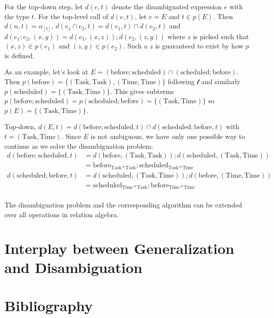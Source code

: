 \documentclass[12pt]{article}
\begin{document}
For the top-down step, let $d(e,t)$ denote the disambiguated expression $e$ with the type $t$.
For the top-level call of $d(e,t)$, let $e=E$ and $t\in p(E)$.
Then $d(n,t) = n_{[t]}$, $d(e_1 \cap e_2, t) = d(e_1,t) \cap d(e_2,t)$ and $d(e_1 ; e_2, (x,y)) = d(e_1, (x,z)) ; d(e_2, (z,y))$ where $z$ is picked such that $(x,z)\in p(e_1)$ and $(z,y)\in p(e_2)$.
Such a $z$ is guaranteed to exist by how $p$ is defined.

As an example, let's look at $E = (\mathrm{before};\mathrm{scheduled}) \cap (\mathrm{scheduled};\mathrm{before})$.
Then $p(\mathrm{before}) =  \{(\mathrm{Task}, \mathrm{Task}),(\mathrm{Time}, \mathrm{Time})\}$ following $\mathcal{t}$ and similarly $p(\mathrm{scheduled}) = \{(\mathrm{Task}, \mathrm{Time})\}$.
This gives subterms $p(\mathrm{before};\mathrm{scheduled}) = p(\mathrm{scheduled};\mathrm{before}) = \{(\mathrm{Task}, \mathrm{Time})\}$ so $p(E) = \{(\mathrm{Task}, \mathrm{Time})\}$.

Top-down, $d(E,t) = d(\mathrm{before};\mathrm{scheduled},t) \cap d(\mathrm{scheduled};\mathrm{before},t)$ with $t=(\mathrm{Task}, \mathrm{Time})$.
Since $E$ is not ambiguous, we have only one possible way to continue as we solve the disambiguation problem:
\begin{align*}d(\mathrm{before};\mathrm{scheduled},t) &= d(\mathrm{before},(\mathrm{Task}, \mathrm{Task})) ;  d(\mathrm{scheduled},(\mathrm{Task}, \mathrm{Time})) \\
&=\mathrm{before}_{\mathrm{Task} * \mathrm{Task}}; \mathrm{scheduled}_{\mathrm{Task}* \mathrm{Time}}\\
d(\mathrm{scheduled};\mathrm{before},t) &=  d(\mathrm{scheduled},(\mathrm{Task}, \mathrm{Time}));d(\mathrm{before},(\mathrm{Time}, \mathrm{Time}))\\
&=\mathrm{scheduled}_{\mathrm{Time} * \mathrm{Task}}; \mathrm{before}_{\mathrm{Time}* \mathrm{Time}}\\
\end{align*}

The disambiguation problem and the corresponding algorithm can be extended over all operations in relation algebra.

\section{Interplay between Generalization and Disambiguation}

\section{Bibliography}



\end{document}
